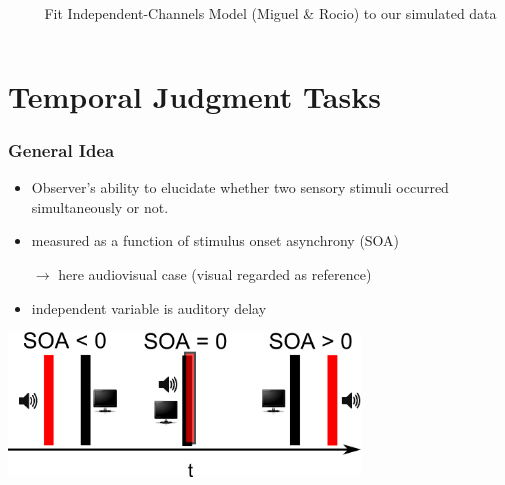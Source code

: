 \documentclass[xcolor={fixpdftex,hyperref,x11names},10pt,pdftex,hyperref={pdftex}]{beamer}
\begin{document}
\begin{frame}
\begin{columns}
\begin{column}{0.30\textwidth}
  \end{column}
  \begin{column}{0.70\textwidth}
  Fit Independent-Channels Model (Miguel \& Rocio) to our simulated data 
  \end{column}
  \end{columns}
\end{frame} 




\section{Temporal Judgment Tasks}
\label{sec:tjt}

\begin{frame}
    \frametitle{General Idea}

    \begin{itemize}
        \item Observer's ability to elucidate whether two sensory stimuli
            occurred simultaneously or not.
        \item measured as a function of stimulus onset asynchrony (SOA)
        \item[$\rightarrow$] here audiovisual case (visual regarded as reference)
        \item independent variable is auditory delay

    \end{itemize}

\begin{center}
    \includegraphics[width=0.7\textwidth]{figs/SOA-in-task.png}
\end{center}

\end{frame}
\end{document}
